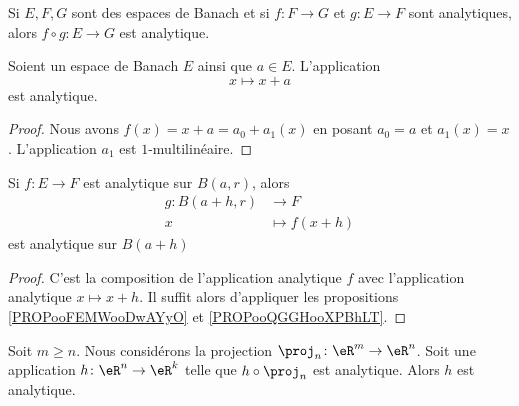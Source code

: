 \begin{proposition}	\label{PROPooQGGHooXPBhLT}
	Si \( E,F,G\) sont des espaces de Banach et si \(f \colon F\to G  \) et \(g \colon E\to F  \) sont analytiques, alors \(f\circ g \colon E \to G  \) est analytique.
\end{proposition}


\begin{proposition}	\label{PROPooFEMWooDwAYyO}
	Soient un espace de Banach \( E\) ainsi que \( a\in E\). L'application
	\begin{equation}
		x\mapsto x+a
	\end{equation}
	est analytique.
\end{proposition}

\begin{proof}
	Nous avons \( f(x)=x+a=a_0+a_1(x)\) en posant \( a_0=a\) et \( a_1(x)=x\). L'application \( a_1\) est \( 1\)-multilinéaire.
\end{proof}

\begin{lemma}	\label{LEMooVGUFooSmJHhl}
	Si \(f \colon E\to F  \) est analytique sur \( B(a,r)\), alors
	\begin{equation}
		\begin{aligned}
			g\colon B(a+h,r) & \to F          \\
			x                & \mapsto f(x+h)
		\end{aligned}
	\end{equation}
	est analytique sur \( B(a+h)\)
\end{lemma}

\begin{proof}
	C'est la composition de l'application analytique \( f\) avec l'application analytique \( x\mapsto x+h\). Il suffit alors d'appliquer les propositions \ref{PROPooFEMWooDwAYyO} et \ref{PROPooQGGHooXPBhLT}.
\end{proof}




\begin{lemma}	\label{LEMooLYIIooNDLRrH}
	Soit \( m\geq n\). Nous considérons la projection \(\proj_n \colon \eR^m\to \eR^n  \). Soit une application \(h \colon \eR^n\to \eR^k  \) telle que \( h\circ\proj_n\) est analytique. Alors \( h\) est analytique.
\end{lemma}

